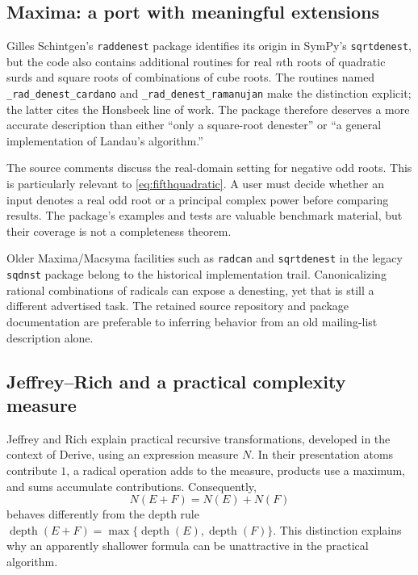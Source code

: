 \documentclass[11pt,a4paper]{article}
\newcommand{\depth}{\operatorname{depth}}
\theoremstyle{definition}
\theoremstyle{remark}
\numberwithin{equation}{section}
\begin{document}
\subsection{Maxima: a port with meaningful extensions}

Gilles Schintgen's \texttt{raddenest} package identifies its origin in SymPy's \texttt{sqrtdenest}, but the code also contains additional routines for real $n$th roots of quadratic surds and square roots of combinations of cube roots. The routines named \texttt{\_rad\_denest\_cardano} and \texttt{\_rad\_denest\_ramanujan} make the distinction explicit; the latter cites the Honsbeek line of work. The package therefore deserves a more accurate description than either ``only a square-root denester'' or ``a general implementation of Landau's algorithm.''\cite{maximaraddenest}

The source comments discuss the real-domain setting for negative odd roots. This is particularly relevant to \eqref{eq:fifthquadratic}. A user must decide whether an input denotes a real odd root or a principal complex power before comparing results. The package's examples and tests are valuable benchmark material, but their coverage is not a completeness theorem.

Older Maxima/Macsyma facilities such as \texttt{radcan} and \texttt{sqrtdenest} in the legacy \texttt{sqdnst} package belong to the historical implementation trail. Canonicalizing rational combinations of radicals can expose a denesting, yet that is still a different advertised task. The retained source repository and package documentation are preferable to inferring behavior from an old mailing-list description alone.\cite{maximaraddenest,maximamanual,maximathread}

\subsection{Jeffrey--Rich and a practical complexity measure}

Jeffrey and Rich explain practical recursive transformations, developed in the context of Derive, using an expression measure $N$. In their presentation atoms contribute $1$, a radical operation adds to the measure, products use a maximum, and sums accumulate contributions. Consequently,
\[
 N(E+F)=N(E)+N(F)
\]
behaves differently from the depth rule $\depth(E+F)=\max\{\depth(E),\depth(F)\}$. This distinction explains why an apparently shallower formula can be unattractive in the practical algorithm.\cite{jeffreyrich}
\end{document}
